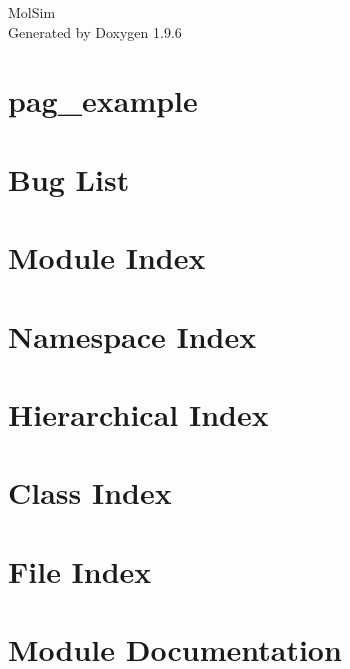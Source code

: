 \documentclass[twoside]{book}
\newcommand{\+}{\discretionary{\mbox{\scriptsize$\hookleftarrow$}}{}{}}
\newcommand{\clearemptydoublepage}{%
    \newpage{\pagestyle{empty}\cleardoublepage}%
  }
\begin{document}
  \raggedbottom
    \hypersetup{pageanchor=false,
                bookmarksnumbered=true,
                pdfencoding=unicode
               }
  \begin{titlepage}
  \vspace*{7cm}
  \begin{center}%
  {\Large Mol\+Sim}\\
  \vspace*{1cm}
  {\large Generated by Doxygen 1.9.6}\\
  \end{center}
  \end{titlepage}
  \clearemptydoublepage
  \tableofcontents
  \clearemptydoublepage
  \hypersetup{pageanchor=true}
\chapter{pag\+\_\+example}
\label{pag_example}

\chapter{Bug List}
\label{bug}

\chapter{Module Index}

\chapter{Namespace Index}

\chapter{Hierarchical Index}

\chapter{Class Index}

\chapter{File Index}

\chapter{Module Documentation}





\end{document}

